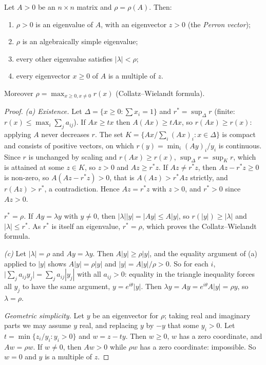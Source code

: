 \begin{theorem}[Perron, 1907]\label{thm:perron}
Let $A>0$ be an $n\times n$ matrix and $\rho=\rho(A)$. Then:
\begin{enumerate}[label=(\alph*)]
\item $\rho>0$ is an eigenvalue of $A$, with an eigenvector $z>0$ (the \emph{Perron vector});
\item $\rho$ is an algebraically simple eigenvalue;
\item every other eigenvalue satisfies $|\lambda|<\rho$;
\item every eigenvector $x\ge0$ of $A$ is a multiple of $z$.
\end{enumerate}
Moreover $\rho=\max_{x\ge0,x\ne0}r(x)$ (Collatz--Wielandt formula).
\end{theorem}
\begin{proof}
\emph{(a) Existence.} Let $\Delta=\{x\ge0:\sum x_i=1\}$ and $r^*=\sup_\Delta r$ (finite: $r(x)\le\max_i\sum_ja_{ij}$). If
$Ax\ge tx$ then $A(Ax)\ge tAx$, so $r(Ax)\ge r(x)$: applying $A$ never decreases $r$. The set $K=\{Ax/\sum_i(Ax)_i:x\in\Delta\}$
is compact and consists of positive vectors, on which $r(y)=\min_i(Ay)_i/y_i$ is continuous. Since $r$ is unchanged by
scaling and $r(Ax)\ge r(x)$, $\sup_\Delta r=\sup_Kr$, which is attained at some $z\in K$, so $z>0$ and $Az\ge r^*z$. If
$Az\ne r^*z$, then $Az-r^*z\ge0$ is non-zero, so $A(Az-r^*z)>0$, that is $A(Az)>r^*Az$ strictly, and $r(Az)>r^*$, a
contradiction. Hence $Az=r^*z$ with $z>0$, and $r^*>0$ since $Az>0$.

\emph{$r^*=\rho$.} If $Ay=\lambda y$ with $y\ne0$, then $|\lambda||y|=|Ay|\le A|y|$, so $r(|y|)\ge|\lambda|$ and $|\lambda|\le
r^*$. As $r^*$ is itself an eigenvalue, $r^*=\rho$, which proves the Collatz--Wielandt formula.

\emph{(c)} Let $|\lambda|=\rho$ and $Ay=\lambda y$. Then $A|y|\ge\rho|y|$, and the equality argument of (a) applied to
$|y|$ shows $A|y|=\rho|y|$ and $|y|=A|y|/\rho>0$. So for each $i$, $\bigl|\sum_ja_{ij}y_j\bigr|=\sum_ja_{ij}|y_j|$ with all
$a_{ij}>0$: equality in the triangle inequality forces all $y_j$ to have the same argument, $y=e^{i\theta}|y|$. Then $\lambda
y=Ay=e^{i\theta}A|y|=\rho y$, so $\lambda=\rho$.

\emph{Geometric simplicity.} Let $y$ be an eigenvector for $\rho$; taking real and imaginary parts we may assume $y$ real,
and replacing $y$ by $-y$ that some $y_i>0$. Let $t=\min\{z_i/y_i:y_i>0\}$ and $w=z-ty$. Then $w\ge0$, $w$ has a zero
coordinate, and $Aw=\rho w$. If $w\ne0$, then $Aw>0$ while $\rho w$ has a zero coordinate: impossible. So $w=0$ and $y$ is
a multiple of $z$.


\end{proof}
